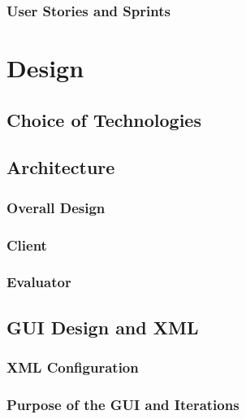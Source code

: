 \documentclass{l4proj}
\begin{document}
\subsection{User Stories and Sprints}



\chapter{Design}

\section{Choice of Technologies}



\section{Architecture}

\subsection{Overall Design}


\subsection{Client}


\subsection{Evaluator}


\section{GUI Design and XML}


\subsection{XML Configuration}


\subsection{Purpose of the GUI and Iterations}

\end{document}
